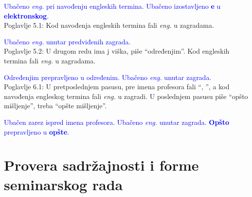 \documentclass[a4paper]{report}
\newcommand{\odgovor}[1]{\textcolor{blue}{#1}}
\begin{document}
\odgovor{Ubačeno \textit{eng.} pri navođenju engleskih termina. Ubačeno izostavljeno \textbf{e} u \textbf{elektronskog}.}
\\\textbullet Poglavlje 5.1: Kod navođenja engleskih termina fali \textit{eng.} u zagradama.

\odgovor{Ubačeno \textit{eng.} unutar predviđenih zagrada.}
\\\textbullet Poglavlje 5.2: U drugom redu ima j viška, piše “određenjim”. Kod engleskih termina fali \textit{eng.} u zagradama.

\odgovor{Određenjim prepravljeno u određenim. Ubačeno \textit{eng.} unutar zagrada.}
\\\textbullet Poglavlje 6.1: U pretposlednjem pasusu, pre imena profesora fali “, ”, a kod navođenja engleskog termina fali \textit{eng.} u zagradi. U poslednjem pasusu piše “opšto mišljenje”, treba “opšte mišljenje”.

\odgovor{Ubačen zarez ispred imena profesora. Ubačeno \textit{eng.} unutar zagrada. \textbf{Opšto} prepravljeno u \textbf{opšte}.}


\section{Provera sadržajnosti i forme seminarskog rada}
\end{document}
